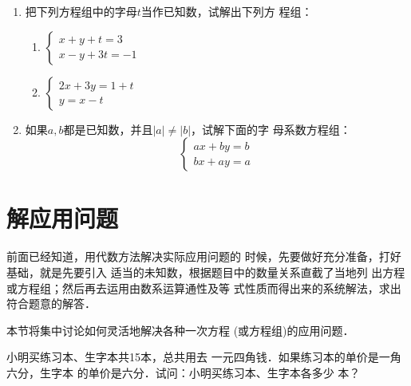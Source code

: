 \begin{enumerate}
\item 把下列方程组中的字母$t$当作已知数，试解出下列方
程组：
\begin{multicols}{2}
    \begin{enumerate}
\item $\begin{cases}
    x+y+t=3\\ x-y+3t=-1
\end{cases}$
\item $\begin{cases}
    2x+3y=1+t\\ y=x-t
\end{cases}$
\end{enumerate}
\end{multicols}

\item 如果$a,b$都是已知数，并且$|a|\ne |b|$，试解下面的字
母系数方程组：
\[\begin{cases}
    ax+by=b\\ bx+ay=a
\end{cases} \]
\end{enumerate}


\section{解应用问题}
    前面已经知道，用代数方法解决实际应用问题的
时候，先要做好充分准备，打好基础，就是先要引入
适当的未知数，根据题目中的数量关系直截了当地列
出方程或方程组；然后再去运用由数系运算通性及等
式性质而得出来的系统解法，求出符合题意的解答．

    本节将集中讨论如何灵活地解决各种一次方程
  (或方程组)的应用问题．

    
\begin{example}
    小明买练习本、生字本共15本，总共用去
一元四角钱．如果练习本的单价是一角六分，生字本
的单价是六分．试问：小明买练习本、生字本各多少
本？
\end{example}

